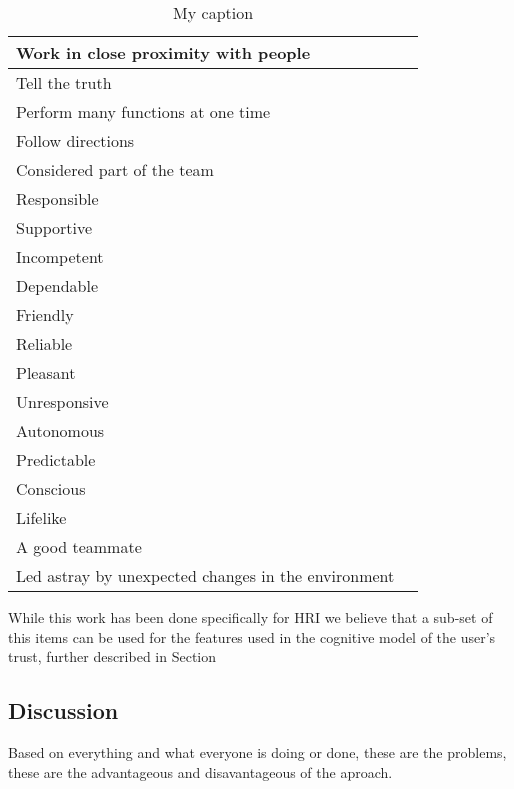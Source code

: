 \begin{table}[p]
\begin{tabular}{p{5cm}|l}
		Work in close proximity with people & \\ \hline
		Tell the truth & \\ \hline
		Perform many functions at one time & \\ \hline
		Follow directions & \\ \hline
		Considered part of the team & \\ \hline
		Responsible & \\ \hline
		Supportive & \\ \hline
		Incompetent & \\ \hline
		Dependable & \\ \hline
		Friendly & \\ \hline
		Reliable & \\ \hline
		Pleasant & \\ \hline
		Unresponsive & \\ \hline
		Autonomous & \\ \hline
		Predictable & \\ \hline
		Conscious & \\ \hline
		Lifelike & \\ \hline
		A good teammate & \\ \hline
		Led astray by unexpected changes in the environment & \\
	\end{tabular}
	\caption{My caption}
	\label{my-label}
\end{table}

While this work has been done specifically for \ac{HRI} we believe that a sub-set of this items can be used for the features used in the cognitive model of the user's trust, further described in Section %






\subsection{Discussion}
\label{subsec:RelWorkDiscussion}

Based on everything and what everyone is doing or done, these are the problems, these are the advantageous and disavantageous of the aproach.